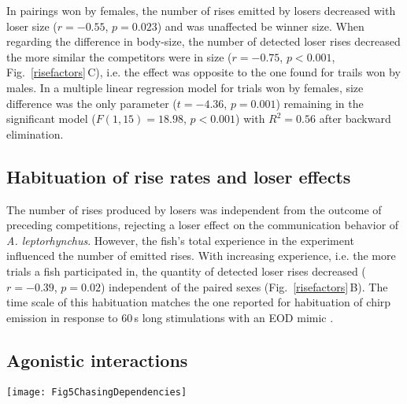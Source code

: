 \documentclass[vruler,JEB]{COB}%
\newcommand{\lepto}{\textit{A. leptorhynchus}}
\newcommand{\figitem}[1]{\textsf{\bfseries\uppercase{#1}}\penalty10000 }
\newcommand{\panel}[1]{\textsf{#1}}
\newcommand{\subfref}[2]{\textup{\ref{#1}}\,\panel{#2}}
\newcommand{\Figb}{Fig.}
\newcommand{\Subfigrefb}[2]{\Figb~\subfref{#1}{#2}}
\begin{document}
In pairings won by females, the number of rises emitted by losers decreased with loser size ($r=-0.55$, $p=0.023$) and was unaffected be winner size. When regarding the difference in body-size, the number of detected loser rises decreased the more similar the competitors were in size ($r=-0.75$, $p<0.001$, \Subfigrefb{risefactors}{C}), i.e. the effect was opposite to the one found for trails won by males. In a multiple linear regression model for trials won by females, size difference was the only parameter ($t=-4.36$, $p=0.001$) remaining in the significant model ($F(1,15)=18.98$, $p<0.001$) with $R^2 = 0.56$ after backward elimination.

\subsection{Habituation of rise rates and loser effects}

The number of rises produced by losers was independent from the outcome of preceding competitions, rejecting a loser effect on the communication behavior of \lepto{}. However, the fish's total experience in the experiment influenced the number of emitted rises. With increasing experience, i.e. the more trials a fish participated in, the quantity of detected loser rises decreased ($r=-0.39$, $p=0.02$) independent of the paired sexes (\Subfigrefb{risefactors}{B}). The time scale of this habituation matches the one reported for habituation of chirp emission in response to 60\,s long stimulations with an EOD mimic \citep{Harvey2010}.

\subsection{Agonistic interactions}

\begin{figure*}[!h]
\centerline{\texttt{[image: Fig5ChasingDependencies]}}
\caption{Agonistic interactions. While the number of agonistic interactions was independent of the physical characteristics of the opponents, the duration of chasing events showed similar dependencies as the number of rises. \figitem{A} The median chasing duration were the shortest in male-male interactions. In the annotations of the sex pairings the first symbol indicates the winner. \figitem{B} The median chasing duration increased with the number of rises emitted by losers. \figitem{C} In trials won by males the median chasing duration increased with losers approaching and exceeding the size of winners ($\Delta\text{size} = \text{size}_{\text{loser}} - \text{size}_{\text{winner}}$). In trials won by females the opposite effect was observed, however similar explanations as for the quantity of rises in the respective pairings apply (\Subfigrefb{risefactors}{B}). Correlation coefficients and their significance are shown in corresponding colors. \figitem{D} With increasing experience in the experiments the median chasing duration decreased.}
\label{agonistics}
\end{figure*}
\end{document}

